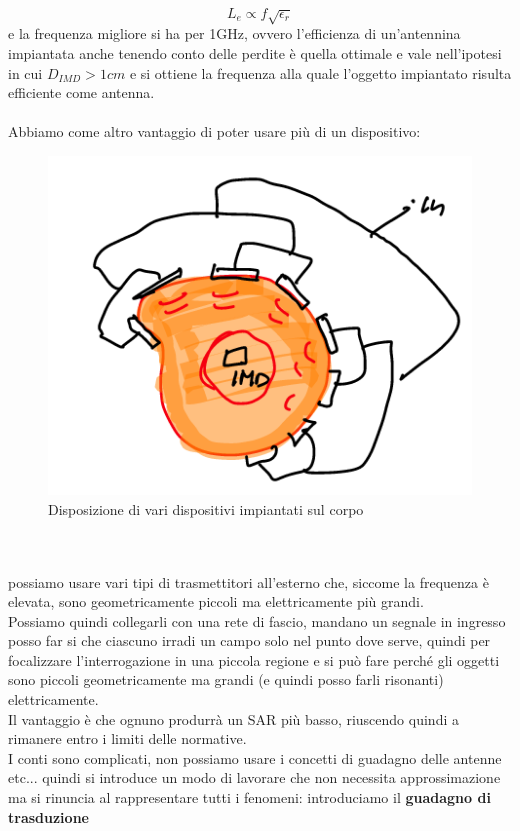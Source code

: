 \documentclass[oneside, 12pt]{extbook}
\begin{document}
\begin{equation}
	L_e \propto f\sqrt{\epsilon_r}
\end{equation}
e la frequenza migliore si ha per 1GHz, ovvero l'efficienza di un'antennina impiantata anche tenendo conto delle perdite è quella ottimale e vale nell'ipotesi in cui $D_{IMD} > 1cm$ e si ottiene la frequenza alla quale l'oggetto impiantato risulta efficiente come antenna.\\\\Abbiamo come altro vantaggio di poter usare più di un dispositivo:\\
\begin{figure}
	\includegraphics[scale=0.5]{immagini/disp_imp.png}
	\caption{Disposizione di vari dispositivi impiantati sul corpo}
\end{figure}
\\\\possiamo usare vari tipi di trasmettitori all'esterno che, siccome la frequenza è elevata, sono geometricamente piccoli ma elettricamente più grandi.\\Possiamo quindi collegarli con una rete di fascio, mandano un segnale in ingresso posso far si che ciascuno irradi un campo solo nel punto dove serve, quindi per focalizzare l'interrogazione in una piccola regione e si può fare perché gli oggetti sono piccoli geometricamente ma grandi (e quindi posso farli risonanti) elettricamente.\\Il vantaggio è che ognuno produrrà un SAR più basso, riuscendo quindi a rimanere entro i limiti delle normative.\\I conti sono complicati, non possiamo usare i concetti di guadagno delle antenne etc... quindi si introduce un modo di lavorare che non necessita approssimazione ma si rinuncia al rappresentare tutti i fenomeni: introduciamo il \textbf{guadagno di trasduzione}
\end{document}
